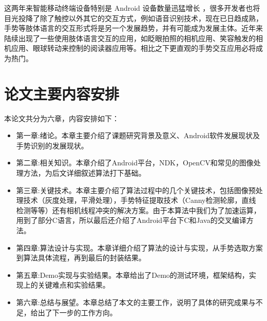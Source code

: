 \documentclass{XDBAthesis}
\begin{document}
这两年来智能移动终端设备特别是 Android 设备数量迅猛增长\cite{王赞超2013} ，很多开发者也将目光投降了除了触控以外其它的交互方式，例如语音识别技术，现在已日趋成熟，手势等肢体语言的交互形式将是另一个发展趋势，并有可能成为发展主体。近年来陆续出现了一些使用肢体语言交互的应用，如眨眼拍照的相机应用、笑容触发的相机应用、眼球转动来控制的阅读器应用等。相比之下更直观的手势交互应用必将成为热门。

\section{论文主要内容安排}

本论文共分为六章，内容安排如下：
\begin{itemize}
    \item 第一章:绪论。本章主要介绍了课题研究背景及意义、Android软件发展现状及手势识别的发展现状。
    \item 第二章:相关知识。本章介绍了Android平台，NDK，OpenCV和常见的图像处理方法，为后文详细叙述算法打下基础。
    \item 第三章:关键技术。本章主要介绍了算法过程中的几个关键技术，包括图像预处理技术（灰度处理，平滑处理），手势特征提取技术（Canny检测轮廓，直线检测等等）还有相机线程冲突的解决方案。由于本算法中我们为了加速运算，用到了部分C语言，所以最后还介绍了Android平台下C和Java的交叉编译方法。
    \item 第四章:算法设计与实现。本章详细介绍了算法的设计与实现，从手势选取方案到算法具体流程，再到最后的封装结果。
    \item 第五章:Demo实现与实验结果。本章给出了Demo的测试环境，框架结构，实现上的关键难点和实验结果。
    \item 第六章:总结与展望。本章总结了本文的主要工作，说明了具体的研究成果与不足，给出了下一步的工作方向。
\end{itemize}

\ifx\allfiles\undefined
%

\end{document}
